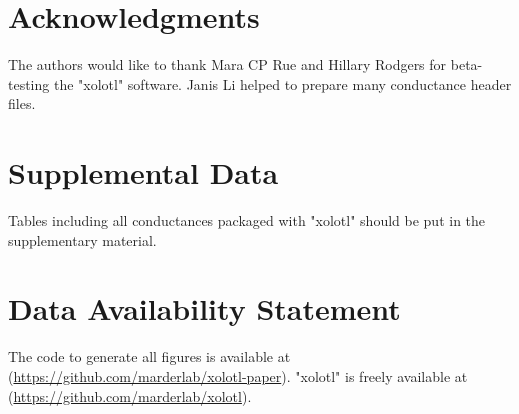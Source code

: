 \documentclass{frontiersSCNS} %
\begin{document}
\section*{Acknowledgments}
The authors would like to thank Mara CP Rue and Hillary Rodgers for beta-testing the "xolotl" software. Janis Li helped to prepare many conductance header files.

\section*{Supplemental Data}
Tables including all conductances packaged with "xolotl" should be put in the supplementary material.

\section*{Data Availability Statement}

The code to generate all figures is available at (\url{https://github.com/marderlab/xolotl-paper}). "xolotl" is freely available at (\url{https://github.com/marderlab/xolotl}).

%
%
%
%
%
%

\printbibliography

%
%
%
%
%
%



\FloatBarrier

\newpage
\end{document}
